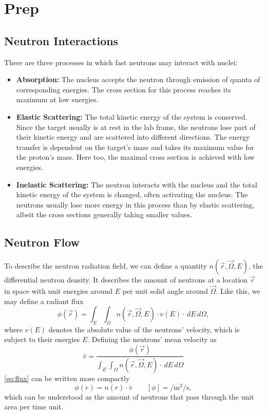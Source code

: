 \setcounter{chapter}{-1}
\chapter{Prep}
\section{Neutron Interactions}\label{sec:inter}
There are three processes in which fast neutrons may interact with nuclei:
\begin{itemize}
	\item \textbf{Absorption:} The nucleus accepts the neutron through emission of quanta of corresponding energies.
	The cross section for this process reaches its maximum at low energies.
	\item \textbf{Elastic Scattering:} The total kinetic energy of the system is conserved.
	Since the target usually is at rest in the lab frame, the neutrons lose part of their kinetic energy and are scattered into different directions.
	The energy transfer is dependent on the target's mass and takes its maximum value for the proton's mass.
	Here too, the maximal cross section is achieved with low energies.
	\item \textbf{Inelastic Scattering:} The neutron interacts with the nucleus and the total kinetic energy of the system is changed, often activating the nucleus.
	The neutrons usually lose more energy in this process than by elastic scattering, albeit the cross sections generally taking smaller values.
\end{itemize}

\section{Neutron Flow}\label{sec:flow}
To describe the neutron radiation field, we can define a quantity $n(\vec{r}, \vec{\Omega}, E)$, the differential neutron density.
It describes the amount of neutrons at a location $\vec{r}$ in space with unit energies around $E$ per unit solid angle around $\vec{\Omega}$.
Like this, we may define a radiant flux
\begin{equation}\label{eq:flux}
	\phi(\vec{r}) = \int_E \int_\Omega n(\vec{r}, \vec{\Omega}, E)\cdot v(E)\cdot \,dE \,d\Omega,
\end{equation}
where $v(E)$ denotes the absolute value of the neutrons' velocity, which is subject to their energies $E$.
Defining the neutrons' mean velocity as
\begin{equation*}
	\bar{v} = \frac{\phi(\vec{r})}{\int_E \int_\Omega n(\vec{r}, \vec{\Omega}, E)\cdot \,dE \,d\Omega}
\end{equation*}
\autoref{eq:flux} can be written more compactly
\begin{equation*}
	\phi(r) = n(r)\cdot \bar{v} \qquad \left[\phi\right]=\si{\per\meter\squared\per\second},
\end{equation*}
which can be understood as the amount of neutrons that pass through the unit area per time unit.

